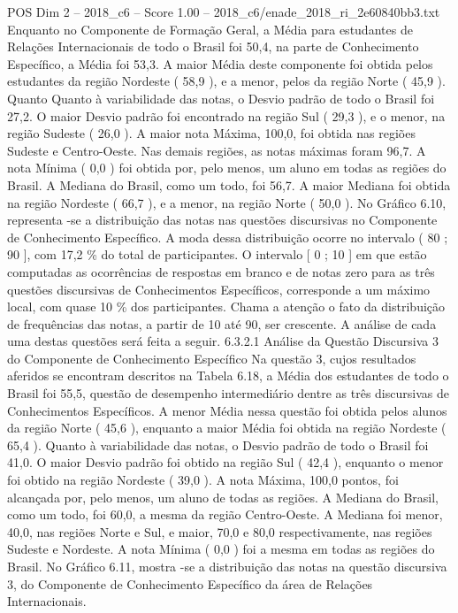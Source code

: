 \begin{textsample}{POS Dim 2 – 2018\_c6 – Score 1.00 – 2018\_c6/enade\_2018\_ri\_2e60840bb3.txt}
Enquanto no Componente de Formação Geral, a Média para estudantes de Relações Internacionais de todo o Brasil foi 50,4, na parte de Conhecimento Específico, a Média foi 53,3.
A maior Média deste componente foi obtida pelos estudantes da região Nordeste ( 58,9 ), e a menor, pelos da região Norte ( 45,9 ).
Quanto Quanto à variabilidade das notas, o Desvio padrão de todo o Brasil foi 27,2.
O maior Desvio padrão foi encontrado na região Sul ( 29,3 ), e o menor, na região Sudeste ( 26,0 ).
A maior nota Máxima, 100,0, foi obtida nas regiões Sudeste e Centro-Oeste.
Nas demais regiões, as notas máximas foram 96,7.
A nota Mínima ( 0,0 ) foi obtida por, pelo menos, um aluno em todas as regiões do Brasil.
A Mediana do Brasil, como um todo, foi 56,7.
A maior Mediana foi obtida na região Nordeste ( 66,7 ), e a menor, na região Norte ( 50,0 ).
No Gráfico 6.10, representa -se a distribuição das notas nas questões discursivas no Componente de Conhecimento Específico.
A moda dessa distribuição ocorre no intervalo ( 80 ; 90 ], com 17,2 \% do total de participantes.
O intervalo [ 0 ; 10 ] em que estão computadas as ocorrências de respostas em branco e de notas zero para as três questões discursivas de Conhecimentos Específicos, corresponde a um máximo local, com quase 10 \% dos participantes.
Chama a atenção o fato da distribuição de frequências das notas, a partir de 10 até 90, ser crescente.
A análise de cada uma destas questões será feita a seguir. 6.3.2.1 Análise da Questão Discursiva 3 do Componente de Conhecimento Específico Na questão 3, cujos resultados aferidos se encontram descritos na Tabela 6.18, a Média dos estudantes de todo o Brasil foi 55,5, questão de desempenho intermediário dentre as três discursivas de Conhecimentos Específicos.
A menor Média nessa questão foi obtida pelos alunos da região Norte ( 45,6 ), enquanto a maior Média foi obtida na região Nordeste ( 65,4 ).
Quanto à variabilidade das notas, o Desvio padrão de todo o Brasil foi 41,0.
O maior Desvio padrão foi obtido na região Sul ( 42,4 ), enquanto o menor foi obtido na região Nordeste ( 39,0 ).
A nota Máxima, 100,0 pontos, foi alcançada por, pelo menos, um aluno de todas as regiões.
A Mediana do Brasil, como um todo, foi 60,0, a mesma da região Centro-Oeste.
A Mediana foi menor, 40,0, nas regiões Norte e Sul, e maior, 70,0 e 80,0 respectivamente, nas regiões Sudeste e Nordeste.
A nota Mínima ( 0,0 ) foi a mesma em todas as regiões do Brasil.
No Gráfico 6.11, mostra -se a distribuição das notas na questão discursiva 3, do Componente de Conhecimento Específico da área de Relações Internacionais.

\end{textsample}
